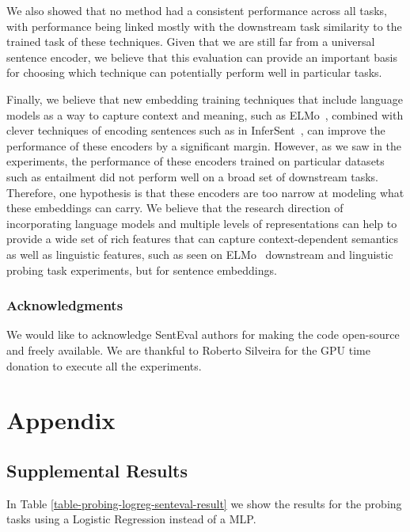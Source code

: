 \documentclass{article}
\begin{document}
We also showed that no method had a consistent performance across all tasks, with performance being linked mostly with the downstream task similarity to the trained task of these techniques. Given that we are still far from a universal sentence encoder, we believe that this evaluation can provide an important basis for choosing which technique can potentially perform well in particular tasks.


Finally, we believe that new embedding training techniques that include language models as a way to capture context and meaning, such as ELMo~\cite{peters2018deep}, combined with clever techniques of encoding sentences such as in InferSent~\cite{conneau2017supervised}, can improve the performance of these encoders by a significant margin. However, as we saw in the experiments, the performance of these encoders trained on particular datasets such as entailment did not perform well on a broad set of downstream tasks. Therefore, one hypothesis is that these encoders are too narrow at modeling what these embeddings can carry. We believe that the research direction of incorporating language models and multiple levels of representations can help to provide a wide set of rich features that can capture context-dependent semantics as well as linguistic features, such as seen on ELMo~\cite{peters2018deep} downstream and linguistic probing task experiments, but for sentence embeddings. 

\subsubsection*{Acknowledgments}
We would like to acknowledge SentEval \cite{conneau2018senteval} authors for making the code open-source and freely available. We are thankful to Roberto Silveira for the GPU time donation to execute all the experiments. 



\appendix
\section{Appendix}
\subsection{Supplemental Results}
In Table \ref{table-probing-logreg-senteval-result} we show the results for the probing tasks using a Logistic Regression instead of a MLP.
\end{document}

